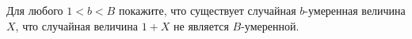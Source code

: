 Для любого $1 < b < B$ покажите, что существует случайная $b$-умеренная величина $X$, что случайная
величина $1 + X$ не является $B$-умеренной.